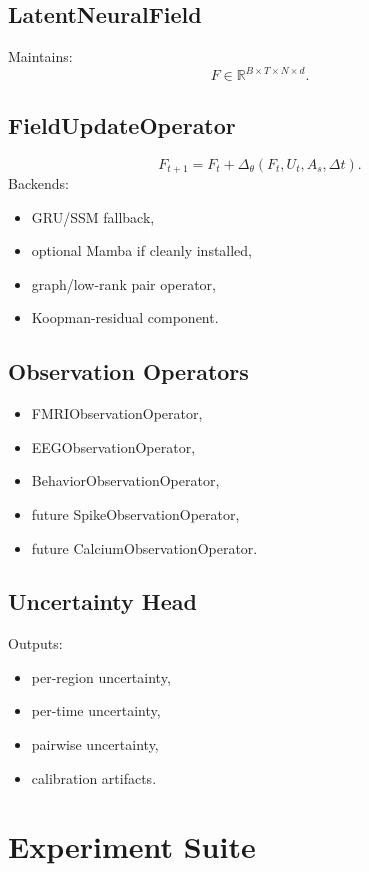 \documentclass[11pt]{article}
\newcommand{\R}{\mathbb{R}}
\begin{document}
\subsection{LatentNeuralField}
Maintains:
\begin{equation}
F\in\R^{B\times T\times N\times d}.
\end{equation}

\subsection{FieldUpdateOperator}
\begin{equation}
F_{t+1}=F_t+\Delta_\theta(F_t,U_t,A_s,\Delta t).
\end{equation}
Backends:
\begin{itemize}
\item GRU/SSM fallback,
\item optional Mamba if cleanly installed,
\item graph/low-rank pair operator,
\item Koopman-residual component.
\end{itemize}

\subsection{Observation Operators}
\begin{itemize}
\item FMRIObservationOperator,
\item EEGObservationOperator,
\item BehaviorObservationOperator,
\item future SpikeObservationOperator,
\item future CalciumObservationOperator.
\end{itemize}

\subsection{Uncertainty Head}
Outputs:
\begin{itemize}
\item per-region uncertainty,
\item per-time uncertainty,
\item pairwise uncertainty,
\item calibration artifacts.
\end{itemize}

\section{Experiment Suite}
\end{document}
